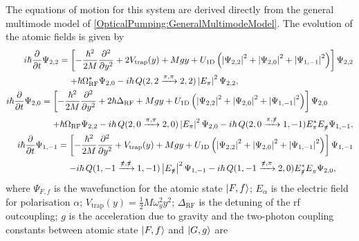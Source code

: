 The equations of motion for this system are derived directly from the general multimode model of \eqref{OpticalPumping:GeneralMultimodeModel}.  The evolution of the atomic fields is given by
\begin{subequations}
    \label{OpticalPumping:3LevelModel:WavefunctionEvolution}
    \begin{align}
        \begin{split}
            i \hbar \frac{\partial}{\partial t} \Psi_{2,2} &= \left[- \frac{\hbar^2}{2 M} \frac{\partial^2}{\partial y^2} + 2 V_\text{trap}(y) + M g y + U_\text{1D}\left(\abs{\Psi_{2, 2}}^2 + \abs{\Psi_{2, 0}}^2 + \abs{\Psi_{1, -1}}^2\right)\right] \Psi_{2, 2} \\
            &\relphantom{=} + \hbar \Omega_\text{RF}^* \Psi_{2, 0} -i \hbar\, Q(2,2 \xrightarrow{\pi,\pi} 2, 2) \abs{E_\pi}^2 \Psi_{2, 2},
        \end{split}\\
        \begin{split}
            i \hbar \frac{\partial}{\partial t} \Psi_{2, 0} &= \left[ - \frac{\hbar^2}{2M} \frac{\partial^2}{\partial y^2} + 2 \hbar \Delta_\text{RF} + M g y + U_\text{1D}\left(\abs{\Psi_{2, 2}}^2 + \abs{\Psi_{2, 0}}^2 + \abs{\Psi_{1, -1}}^2\right)\right] \Psi_{2, 0} \\
            &\relphantom{=} + \hbar \Omega_\text{RF} \Psi_{2, 2}  - i \hbar \,Q({2, 0 \xrightarrow{\pi,\pi} 2, 0}) \abs{E_\pi}^2 \Psi_{2, 0} - i \hbar \,Q(2, 0 \xrightarrow{\pi,\pislash} 1, -1) E_\pi^* E_{\pislash}^{\phantom{*}} \Psi_{1, -1},
        \end{split}\\
        \begin{split}
            i \hbar \frac{\partial}{\partial t} \Psi_{1, -1} &= \left[ - \frac{\hbar^2}{2 M} \frac{\partial^2}{\partial y^2} + V_{\text{trap}}(y) + M g y + U_\text{1D} \left( \abs{\Psi_{2, 2}}^2 + \abs{\Psi_{2, 0}}^2 + \abs{\Psi_{1, -1}}^2\right)  \right] \Psi_{1, -1}\\
            &\relphantom{=} - i \hbar \,Q(1, -1 \xrightarrow{\pislash,\pislash} 1, -1) \abs{E_{\pislash}}^2 \Psi_{1, -1} - i \hbar \,Q(1, -1 \xrightarrow{\pislash,\pi} 2, 0) E_{\pislash}^* E_\pi^{\phantom{*}}\Psi_{2, 0},
        \end{split}
    \end{align}
\end{subequations}
where $\Psi_{F,f}$ is the wavefunction for the atomic state ${\left|F, f\right>}$; $E_\alpha$ is the electric field for polarisation $\alpha$; $V_\text{trap}(y) = \frac{1}{2} M \omega_y^2 y^2$; $\Delta_\text{RF}$ is the detuning of the rf outcoupling; $g$ is the acceleration due to gravity and the two-photon coupling constants between atomic state ${\left|F, f\right>}$ and ${\left|G, g\right>}$ are
